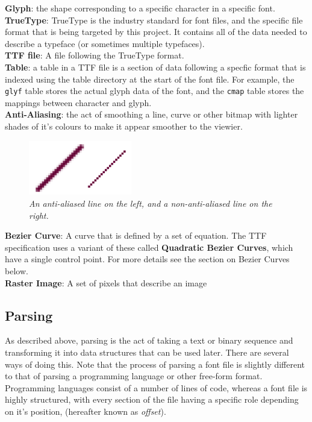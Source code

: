 \documentclass{report}
\begin{document}
\textbf{Glyph}: the shape corresponding to a specific character in a specific
font.
\\

\textbf{TrueType}: TrueType is the industry standard for font files, and the
specific file format that is being targeted by this project. It contains all of
the data needed to describe a typeface (or sometimes multiple typefaces).
\\

\textbf{TTF file}: A file following the TrueType format.
\\

\textbf{Table}: a table in a TTF file is a section of data following a specfic
format that is indexed using the table directory at the start of the font file.
For example, the \texttt{glyf} table stores the actual glyph data of the font,
and the \texttt{cmap} table stores the mappings between character and glyph.
\\

\textbf{Anti-Aliasing}: the act of smoothing a line, curve or other bitmap with
lighter shades of it's colours to make it appear smoother to the viewier.

\begin{figure}[h]
  \centering
  \includegraphics[width=0.4\textwidth]{aa}
  \caption{\textit{An anti-aliased line on the left, and a non-anti-aliased line
    on the right.}}
\end{figure}

\textbf{Bezier Curve}: A curve that is defined by a set of equation. The TTF
specification uses a variant of these called \textbf{Quadratic Bezier Curves},
which have a single control point. For more details see the section on Bezier
Curves below.
\\

\textbf{Raster Image}: A set of pixels that describe an image  

\subsection{Parsing}
As described above, parsing is the act of taking a text or binary sequence and
transforming it into data structures that can be used later. There are several
ways of doing this. Note that the process of parsing a font file is slightly
different to that of parsing a programming language or other free-form format.
Programming languages consist of a number of lines of code, whereas a font file
is highly structured, with every section of the file having a specific role
depending on it's position, (hereafter known as \textit{offset}).
\end{document}
